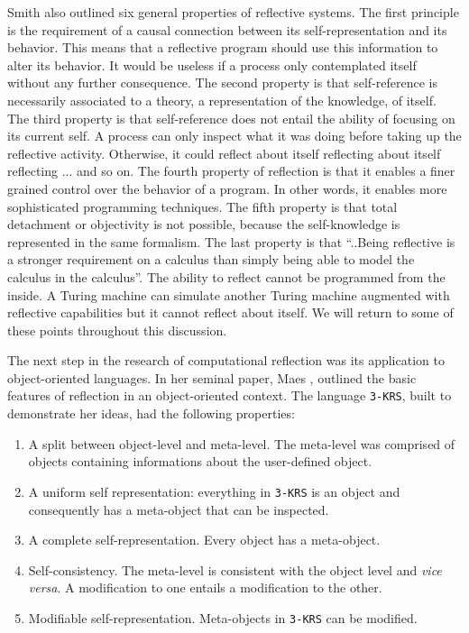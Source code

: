 Smith also outlined six general properties of reflective systems. The first principle is the requirement of a causal connection between
its self-representation and its behavior. This means that a reflective program should use this information to alter its
behavior. It would be useless if a process only contemplated itself without any further consequence. The second property is that
self-reference is necessarily associated to a theory, a representation of the knowledge, of itself. The third property is that
self-reference does not entail the ability of focusing on its current self. A process can only inspect what it was doing before
taking up the reflective activity. Otherwise, it could reflect about itself reflecting about itself reflecting ... and so on.
The fourth property of reflection is that it enables a finer grained control over the behavior of a program. In other words, it
enables more sophisticated programming techniques. The fifth property is that total detachment or objectivity is not possible,
because the self-knowledge is represented in the same formalism. The last property is that ``..Being reflective is a stronger
requirement on a calculus than simply being able to model the calculus in the calculus''. The ability to reflect cannot be
programmed from the inside. A Turing machine can simulate another Turing machine augmented with reflective capabilities but it
cannot reflect about itself. We will return to some of these points throughout this discussion.

The next step in the research of computational reflection was its application to object-oriented languages. In her seminal paper, Maes \cite{Maes},
outlined the basic features of reflection in an object-oriented context. The language \texttt{3-KRS}, built to demonstrate her ideas, had the
following properties:

\begin{enumerate}
 \item A split between object-level and meta-level. The meta-level was comprised of objects containing informations about the user-defined
object.
 \item A uniform self representation: everything in \texttt{3-KRS} is an object and consequently has a meta-object that can be inspected.
 \item A complete self-representation. Every object has a meta-object.
 \item Self-consistency. The meta-level is consistent with the object level and \emph{vice versa}. A modification to one entails a modification
to the other. 
  \item Modifiable self-representation. Meta-objects in \texttt{3-KRS} can be modified.
\end{enumerate}

